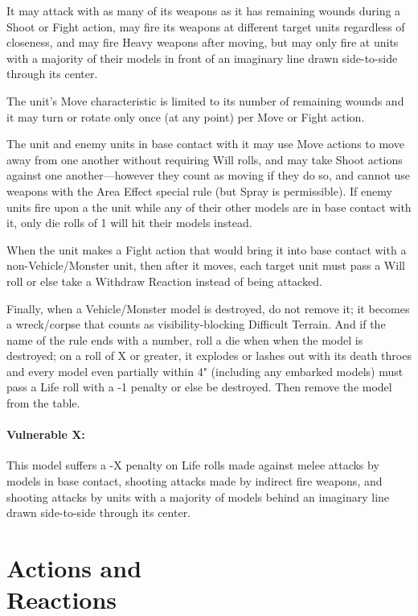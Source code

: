 \begin{multicols}{2}
It may attack with as many of its weapons as it has remaining wounds during a Shoot or Fight action, may fire its weapons at different target units regardless of closeness, and may fire Heavy weapons after moving, but may only fire at units with a majority of their models in front of an imaginary line drawn side-to-side through its center.

The unit's Move characteristic is limited to its number of remaining wounds and it may turn or rotate only once (at any point) per Move or Fight action.

The unit and enemy units in base contact with it may use Move actions to move away from one another without requiring Will rolls, and may take Shoot actions against one another—however they count as moving if they do so, and cannot use weapons with the Area Effect special rule (but Spray is permissible). If enemy units fire upon a the unit while any of their other models are in base contact with it, only die rolls of 1 will hit their models instead.

When the unit makes a Fight action that would bring it into base contact with a non-Vehicle/Monster unit, then after it moves, each target unit must pass a Will roll or else take a Withdraw Reaction instead of being attacked.

Finally, when a Vehicle/Monster model is destroyed, do not remove it; it becomes a wreck/corpse that counts as visibility-blocking Difficult Terrain. And if the name of the rule ends with a number, roll a die when when the model is destroyed; on a roll of X or greater, it explodes or lashes out with its death throes and every model even partially within 4" (including any embarked models) must pass a Life roll with a -1 penalty or else be destroyed. Then remove the model from the table.

\subsubsection*{Vulnerable X:} This model suffers a -X penalty on Life rolls made against melee attacks by models in base contact, shooting attacks made by indirect fire weapons, and shooting attacks by units with a majority of models behind an imaginary line drawn side-to-side through its center.




\chapter*{Actions and\\ Reactions}


\end{multicols}
